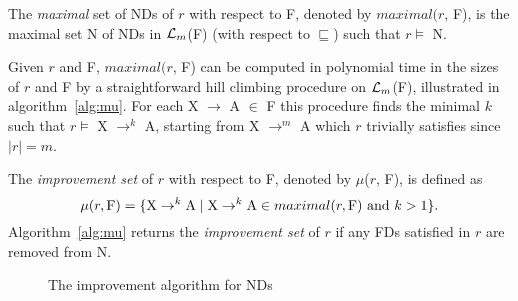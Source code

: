 \begin{definition}
\begin{rm}
The {\em maximal} set of NDs of $r$ with respect to F,
denoted by $maximal(r$, F), is the maximal set N of NDs
in ${\cal L}_m$(F) (with respect to $\sqsubseteq$) such that $r \models$ N.
\end{rm}
\end{definition}
\medskip

Given $r$ and F, $maximal(r$, F) can be computed in polynomial time in the
sizes of $r$ and F by a straightforward hill climbing procedure
on ${\cal L}_m$(F), illustrated in algorithm~\ref{alg:mu}. For each X $\to$ A $\in$ F this procedure finds 
the minimal $k$ such that $r \models$ X $\to^k$ A, starting 
from X $\to^m$ A which $r$ trivially satisfies since $\mid r \mid = m$. 

\begin{definition}
\begin{rm}
The {\em improvement set} of $r$ with respect to F, 
denoted by $\mu$($r$, F), is defined as 
\begin{displaymath}
\mu(r, {\rm F}) = \{{\rm X} \to^k {\rm A} \mid 
{\rm X} \to^k {\rm A} \in maximal(r, {\rm F}) \mbox{ and }  k > 1\}.
\end{displaymath}
Algorithm~\ref{alg:mu} returns the {\em improvement set} of $r$ if any FDs
satisfied in $r$ are removed from N.
\end{rm}
\end{definition}
\medskip


{\renewcommand{\baselinestretch}{1}
\begin{figure}[ht]
\begin{center}
\end{center}
\caption{\label{numdep:fig:mu} The improvement algorithm for NDs}
\end{figure}
}

